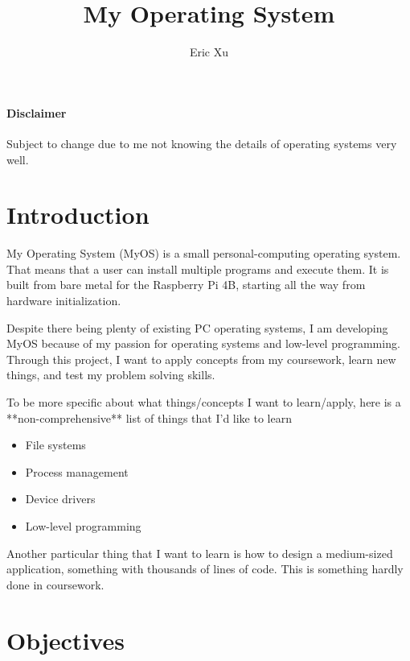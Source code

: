 \documentclass{article}
\title{My Operating System}
\author{Eric Xu}
\begin{document}
\maketitle


\paragraph{Disclaimer} Subject to change due to me not knowing the details of
operating systems very well.

\section{Introduction}%

My Operating System (MyOS) is a small personal-computing operating system.
That means that a user can install multiple programs and execute them. It is
built from bare metal for the Raspberry Pi 4B, starting all the way from
hardware initialization.

Despite there being plenty of existing PC operating systems, I am developing
MyOS because of my passion for operating systems and low-level programming.
Through this project, I want to apply concepts from my coursework, learn new
things, and test my problem solving skills.

To be more specific about what things/concepts I want to learn/apply, here is a
**non-comprehensive** list of things that I'd like to learn

\begin{itemize}
  \item File systems
  \item Process management
  \item Device drivers
  \item Low-level programming
\end{itemize}

Another particular thing that I want to learn is how to design a medium-sized
application, something with thousands of lines of code. This is something hardly
done in coursework.


\section{Objectives}%
\end{document}
